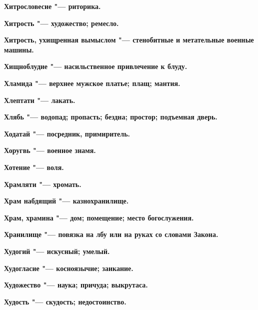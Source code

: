 \bfseries Хитрословесие \normalfont{} "--- риторика. 




\bfseries Хитрость \normalfont{} "--- художество; ремесло. 




\bfseries Хитрость, ухищренная вымыслом \normalfont{} "--- стенобитные и метательные военные машины. 




\bfseries Хищноблудие \normalfont{} "--- насильственное привлечение к блуду. 




\bfseries Хламида \normalfont{} "--- верхнее мужское платье; плащ; мантия. 




\bfseries Хлептати \normalfont{} "--- лакать. 




\bfseries Хлябь \normalfont{} "--- водопад; пропасть; бездна; простор; подъемная дверь. 




\bfseries Ходатай \normalfont{} "--- посредник, примиритель. 




\bfseries Хоругвь \normalfont{} "--- военное знамя. 




\bfseries Хотение \normalfont{} "--- воля. 




\bfseries Храмляти \normalfont{} "--- хромать. 




\bfseries Храм набдящий \normalfont{} "--- казнохранилище. 




\bfseries Храм, храмина \normalfont{} "--- дом; помещение; место богослужения. 




\bfseries Хранилище \normalfont{} "--- повязка на лбу или на руках со словами Закона. 




\bfseries Худогий \normalfont{} "--- искусный; умелый. 




\bfseries Худогласие \normalfont{} "--- косноязычие; заикание. 




\bfseries Художество \normalfont{} "--- наука; причуда; выкрутаса. 




\bfseries Худость \normalfont{} "--- скудость; недостоинство. 




